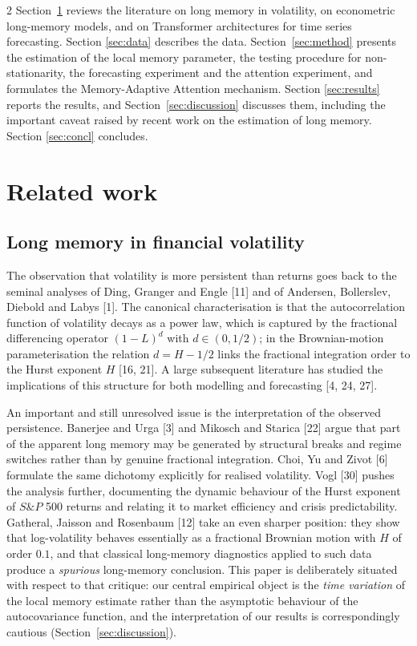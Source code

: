 \documentclass[a4paper,10pt,twoside]{article}
\begin{document}
\begin{multicols}{2}
Section~\ref{sec:related} reviews the literature on long memory in volatility, on econometric
long-memory models, and on Transformer architectures for time series forecasting. Section
\ref{sec:data} describes the data. Section~\ref{sec:method} presents the estimation of the local
memory parameter, the testing procedure for non-stationarity, the forecasting experiment and the
attention experiment, and formulates the Memory-Adaptive Attention mechanism. Section
\ref{sec:results} reports the results, and Section~\ref{sec:discussion} discusses them, including
the important caveat raised by recent work on the estimation of long memory. Section
\ref{sec:concl} concludes.


\section{Related work}\label{sec:related}

\subsection{Long memory in financial volatility}

The observation that volatility is more persistent than returns goes back to the seminal analyses of
Ding, Granger and Engle [11] and of Andersen, Bollerslev, Diebold and Labys
[1]. The canonical characterisation is that the autocorrelation function
of volatility decays as a power law, which is captured by the fractional differencing operator
$(1-L)^d$ with $d\in(0,1/2)$; in the Brownian-motion parameterisation the relation
$d=H-1/2$ links the fractional integration order to the Hurst exponent $H$ [16, 21]. A large subsequent literature has studied the implications of this
structure for both modelling and forecasting [4, 24, 27].

An important and still unresolved issue is the interpretation of the observed persistence.
Banerjee and Urga [3] and Mikosch and Starica [22]
argue that part of the apparent long memory may be generated by structural breaks and regime
switches rather than by genuine fractional integration. Choi, Yu and Zivot [6]
formulate the same dichotomy explicitly for realised volatility. Vogl [30] pushes
the analysis further, documenting the dynamic behaviour of the Hurst exponent of $S\&P$ 500
returns and relating it to market efficiency and crisis predictability. Gatheral, Jaisson and
Rosenbaum [12] take an even sharper position: they show that log-volatility
behaves essentially as a fractional Brownian motion with $H$ of order $0.1$, and that classical
long-memory diagnostics applied to such data produce a \emph{spurious} long-memory conclusion.
This paper is deliberately situated with respect to that critique: our central empirical object is
the \emph{time variation} of the local memory estimate rather than the asymptotic behaviour of the
autocovariance function, and the interpretation of our results is correspondingly cautious
(Section~\ref{sec:discussion}).


\end{multicols}
\end{document}
